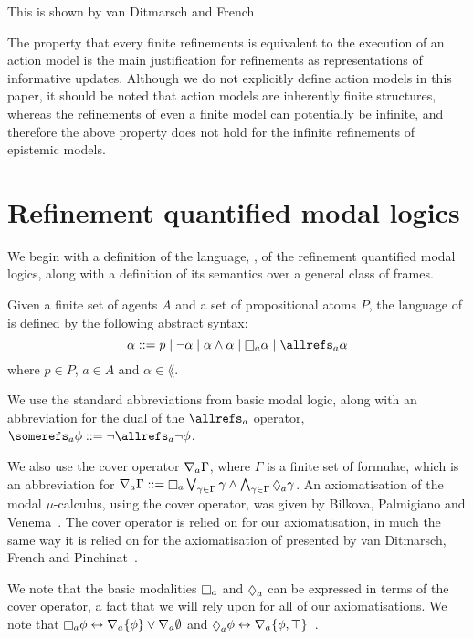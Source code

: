 This is shown by van Ditmarsch and French~\cite{french2009simulation}

The property that every finite refinements is equivalent to the execution of an
action model is the main justification for refinements as representations of
informative updates. Although we do not explicitly define action models in this
paper, it should be noted that action models are inherently finite structures,
whereas the refinements of even a finite model can potentially be infinite, and
therefore the above property does not hold for the infinite refinements of
epistemic models.

\section{Refinement quantified modal logics}

We begin with a definition of the language, \langF{}, of the refinement
quantified modal logics, along with a definition of its semantics over a general
class of frames.

\begin{definition}
Given a finite set of agents $A$ and a set of propositional atoms $P$, the
language of \langF{} is defined by the following abstract syntax:
$$
\alpha ::=  p \bnfalt
            \neg \alpha \bnfalt
            \alpha \land \alpha \bnfalt
            \knows_a \alpha \bnfalt
            \allrefs_a \alpha
$$
where $p \in P$, $a \in A$ and $\alpha \in \lang{}$.
\end{definition}

We use the standard abbreviations from basic modal logic, along with an
abbreviation for the dual of the $\allrefs_a$ operator, $\somerefs_a \phi ::=
\neg \allrefs_a \neg \phi$.

We also use the cover operator $\nabla_a \Gamma$, where $\Gamma$ is a finite
set of formulae, which is an abbreviation for $\covers_a \Gamma ::= \knows_a
\bigvee_{\gamma \in \Gamma} \gamma \land \bigwedge_{\gamma \in \Gamma}
\suspects_a \gamma$. An axiomatisation of the modal $\mu$-calculus, using the
cover operator, was given by Bilkova, Palmigiano and
Venema~\cite{bilkova2008proof}. The cover operator is relied on for our
axiomatisation, in much the same way it is relied on for the axiomatisation of
\logicKiF{} presented by van Ditmarsch, French and
Pinchinat~\cite{french2010future}.

We note that the basic modalities $\knows_a$ and $\suspects_a$ can be expressed
in terms of the cover operator, a fact that we will rely upon for all of our
axiomatisations. We note that $\knows_a \phi \iff \covers_a \{\phi\} \lor
\covers_a \emptyset$ and $\suspects_a \phi \iff \covers_a \{\phi,
\top\}$~\cite{bilkova2008proof}. 

